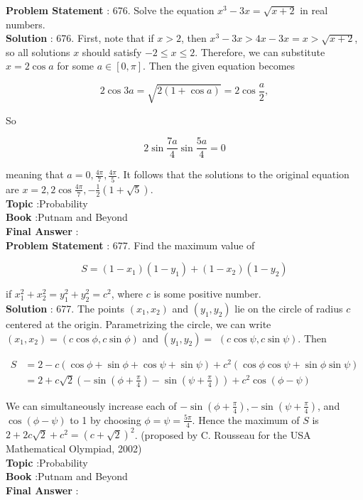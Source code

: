 \documentclass[10pt]{article}
\begin{document}
\textbf{Problem Statement} :
676. Solve the equation $x^{3}-3 x=\sqrt{x+2}$ in real numbers. 
\\
\textbf{Solution} :
676. First, note that if $x>2$, then $x^{3}-3 x>4 x-3 x=x>\sqrt{x+2}$, so all solutions $x$ should satisfy $-2 \leq x \leq 2$. Therefore, we can substitute $x=2 \cos a$ for some $a \in[0, \pi]$. Then the given equation becomes

$$
2 \cos 3 a=\sqrt{2(1+\cos a)}=2 \cos \frac{a}{2},
$$

So

$$
2 \sin \frac{7 a}{4} \sin \frac{5 a}{4}=0
$$

meaning that $a=0, \frac{4 \pi}{7}, \frac{4 \pi}{5}$. It follows that the solutions to the original equation are $x=2,2 \cos \frac{4 \pi}{7},-\frac{1}{2}(1+\sqrt{5})$.
\\
\textbf{Topic} :Probability\\
\textbf{Book} :Putnam and Beyond\\
\textbf{Final Answer} :\\


\textbf{Problem Statement} :
677. Find the maximum value of

$$
S=\left(1-x_{1}\right)\left(1-y_{1}\right)+\left(1-x_{2}\right)\left(1-y_{2}\right)
$$

if $x_{1}^{2}+x_{2}^{2}=y_{1}^{2}+y_{2}^{2}=c^{2}$, where $c$ is some positive number.
\\
\textbf{Solution} :
677. The points $\left(x_{1}, x_{2}\right)$ and $\left(y_{1}, y_{2}\right)$ lie on the circle of radius $c$ centered at the origin. Parametrizing the circle, we can write $\left(x_{1}, x_{2}\right)=(c \cos \phi, c \sin \phi)$ and $\left(y_{1}, y_{2}\right)=$ $(c \cos \psi, c \sin \psi)$. Then

$$
\begin{aligned}
S &=2-c(\cos \phi+\sin \phi+\cos \psi+\sin \psi)+c^{2}(\cos \phi \cos \psi+\sin \phi \sin \psi) \\
&=2+c \sqrt{2}\left(-\sin \left(\phi+\frac{\pi}{4}\right)-\sin \left(\psi+\frac{\pi}{4}\right)\right)+c^{2} \cos (\phi-\psi)
\end{aligned}
$$

We can simultaneously increase each of $-\sin \left(\phi+\frac{\pi}{4}\right),-\sin \left(\psi+\frac{\pi}{4}\right)$, and $\cos (\phi-\psi)$ to 1 by choosing $\phi=\psi=\frac{5 \pi}{4}$. Hence the maximum of $S$ is $2+2 c \sqrt{2}+c^{2}=(c+\sqrt{2})^{2}$. (proposed by C. Rousseau for the USA Mathematical Olympiad, 2002)
\\
\textbf{Topic} :Probability\\
\textbf{Book} :Putnam and Beyond\\
\textbf{Final Answer} :\\
\end{document}

